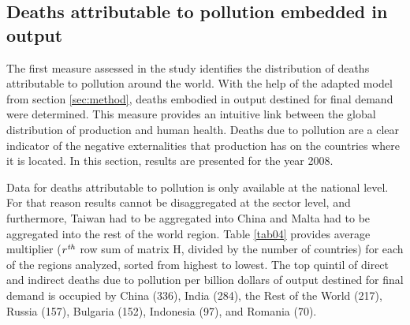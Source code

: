 \documentclass[a4paper,12pt]{article}
\begin{document}
% 

\subsection{Deaths attributable to pollution embedded in output}

The first measure assessed in the study identifies the distribution of deaths attributable to pollution around the world. With the help of the adapted model from section \ref{sec:method},  deaths embodied in output destined for final demand were determined. This measure provides an intuitive link between the global distribution of production and human health. %
Deaths due to pollution are a clear indicator of the negative externalities that production has on the countries where it is located. In this section, results are presented for the year 2008.

Data for deaths attributable to pollution is only available at the national level. For that reason results cannot be disaggregated at the sector level, and furthermore, Taiwan had to be aggregated into China and Malta had to be aggregated into the rest of the world region. Table \ref{tab04} provides average multiplier ($r^\text{\textit{th}}$ row sum of matrix H, divided by the number of countries) for each of the regions analyzed, sorted from highest to lowest. The top quintil of direct and indirect deaths due to pollution per billion dollars of output destined for final demand is occupied by China (336), India (284), the Rest of the World (217), Russia (157), Bulgaria (152), Indonesia (97), and Romania (70).
\end{document}
